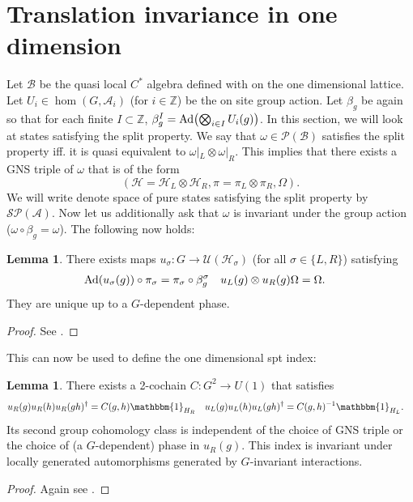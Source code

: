 \documentclass[12pt,a4paper,twoside]{article}
\let\originalleft\left
\let\originalright\right
\renewcommand{\left}{\mathopen{}\mathclose\bgroup\originalleft}
\renewcommand{\right}{\aftergroup\egroup\originalright}
\newcommand{\UU}{\mathcal U}
\newcommand{\BB}{\mathcal B}
\newcommand{\PP}{\mathcal P}
\newcommand{\HH}{\mathcal H}
\newcommand{\ZZ}{\mathbb Z}
\renewcommand{\AA}{\mathcal A}
\newcommand{\id}{\mathbbm{1}}
\newcommand{\Ad}[1]{\textrm{Ad}\left(#1\right)}
\theoremstyle{definition}
\newtheorem{lemma}[theorem]{Lemma}
\numberwithin{equation}{section}
\begin{document}
\section{Translation invariance in one dimension}\label{sec:OneDimensionalIndices}
Let $\BB$ be the quasi local $C^*$ algebra defined with on the one dimensional lattice. Let $U_i\in\hom(G,\AA_i)$ (for $i\in\ZZ$) be the on site group action. Let $\beta_g$ be again so that for each finite $I\subset \ZZ$, $\beta_g^I=\Ad{\bigotimes_{i\in I}U_i(g)}$. In this section, we will look at states satisfying the split property. We say that $\omega\in\PP(\BB)$ satisfies the split property iff. it is quasi equivalent to $\omega|_{L}\otimes\omega|_{R}$. This implies that there exists a GNS triple of $\omega$ that is of the form
\begin{equation}
	(\HH=\HH_L\otimes\HH_R,\pi=\pi_L\otimes\pi_R,\Omega).
\end{equation}
We will write denote space of pure states satisfying the split property by $\mathcal{S}\PP(\AA)$. Now let us additionally ask that $\omega$ is invariant under the group action ($\omega\circ\beta_g=\omega$). The following now holds:
\begin{lemma}
	There exists maps $u_\sigma:G\rightarrow \UU(\HH_\sigma)$ (for all $\sigma\in\{L,R\}$) satisfying
	\begin{align}
		\Ad{u_\sigma(g)}\circ\pi_\sigma&=\pi_\sigma\circ\beta_g^\sigma&u_L(g)\otimes u_R(g)\Omega&=\Omega.
	\end{align}
	They are unique up to a $G$-dependent phase.
\end{lemma}
\begin{proof}
	See \cite{ogata2019classification}.
\end{proof}
This can now be used to define the one dimensional spt index:
\begin{lemma}
	There exists a 2-cochain $C:G^2\rightarrow U(1)$ that satisfies
	\begin{align}
		u_R(g)u_R(h)u_R(gh)^{\dagger}&=C(g,h)\id_{H_R}&u_L(g)u_L(h)u_L(gh)^{\dagger}&=C(g,h)^{-1}\id_{H_L}.
	\end{align}
	Its second group cohomology class is independent of the choice of GNS triple or the choice of (a $G$-dependent) phase in $u_R(g)$. This index is invariant under locally generated automorphisms generated by $G$-invariant interactions.
\end{lemma}
\begin{proof}
	Again see \cite{ogata2019classification}.
\end{proof}
\end{document}

